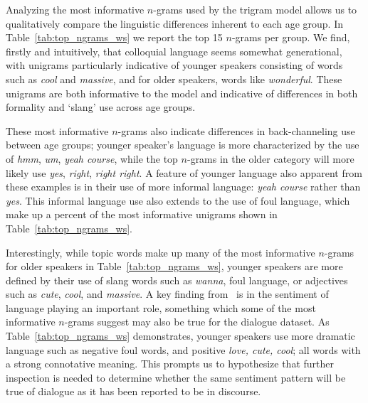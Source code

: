 Analyzing the most informative $n$-grams 
used by the trigram model
allows us to qualitatively compare the linguistic differences inherent to each age group. In Table~\ref{tab:top_ngrams_ws} we report the top 15 $n$-grams per group.
We find, firstly and intuitively, that colloquial language seems somewhat generational, with unigrams particularly indicative of younger speakers consisting of words such as 
\emph{cool} and \emph{massive}, and
for older speakers, words like
\emph{wonderful}.
These unigrams are both informative to the model and indicative of differences in both formality and `slang' use across age groups.

These most informative $n$-grams also indicate differences in back-channeling use between age groups; younger speaker's language is more characterized by the use of \emph{hmm}, \emph{um}, \emph{yeah course}, while the top $n$-grams in the older category will more likely use
\emph{yes}, \emph{right}, \emph{right right}.
A feature of younger language also apparent from these examples is in their use of more informal language: \emph{yeah course} rather than \emph{yes}.
This informal language use also extends to the use of foul language, which make up a percent of the most informative unigrams shown in Table~\ref{tab:top_ngrams_ws}. %

Interestingly, while topic words make up many of the most informative $n$-grams for older speakers in Table~\ref{tab:top_ngrams_ws}, younger speakers are more defined by their use of slang words such as \textit{wanna}, foul language, or adjectives such as \textit{cute}, \emph{cool}, and \emph{massive}.
A key finding from~\citet{schler2006effects} is in the sentiment of language playing an important role, something which some of the most informative $n$-grams suggest may also be true for the dialogue dataset. As Table~\ref{tab:top_ngrams_ws} demonstrates, younger speakers use more dramatic language %
such as negative foul words, and positive \textit{love, cute, cool}; all words with a strong connotative meaning. 
This prompts us to hypothesize that further inspection is needed to determine whether the same sentiment pattern will be true of dialogue as it has been reported to be in discourse.

